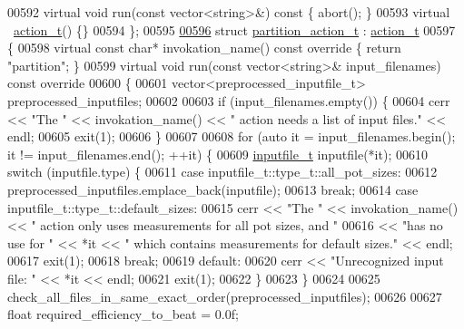 \begin{DoxyCode}
{{{{00592   \textcolor{keyword}{virtual} \textcolor{keywordtype}{void} run(\textcolor{keyword}{const} vector<string>&)\textcolor{keyword}{ const }\{ abort(); \}
00593   \textcolor{keyword}{virtual} ~\hyperlink{structaction__t}{action\_t}() \{\}
00594 \};
00595 
\hyperlink{structpartition__action__t}{00596} \textcolor{keyword}{struct }\hyperlink{structpartition__action__t}{partition\_action\_t} : \hyperlink{structaction__t}{action\_t}
00597 \{
00598   \textcolor{keyword}{virtual} \textcolor{keyword}{const} \textcolor{keywordtype}{char}* invokation\_name()\textcolor{keyword}{ const override }\{ \textcolor{keywordflow}{return} \textcolor{stringliteral}{"partition"}; \}
00599   \textcolor{keyword}{virtual} \textcolor{keywordtype}{void} run(\textcolor{keyword}{const} vector<string>& input\_filenames)\textcolor{keyword}{ const override}
00600 \textcolor{keyword}{  }\{
00601     vector<preprocessed\_inputfile\_t> preprocessed\_inputfiles;
00602 
00603     \textcolor{keywordflow}{if} (input\_filenames.empty()) \{
00604       cerr << \textcolor{stringliteral}{"The "} << invokation\_name() << \textcolor{stringliteral}{" action needs a list of input files."} << endl;
00605       exit(1);
00606     \}
00607 
00608     \textcolor{keywordflow}{for} (\textcolor{keyword}{auto} it = input\_filenames.begin(); it != input\_filenames.end(); ++it) \{
00609       \hyperlink{structinputfile__t}{inputfile\_t} inputfile(*it);
00610       \textcolor{keywordflow}{switch} (inputfile.type) \{
00611         \textcolor{keywordflow}{case} inputfile\_t::type\_t::all\_pot\_sizes:
00612           preprocessed\_inputfiles.emplace\_back(inputfile);
00613           \textcolor{keywordflow}{break};
00614         \textcolor{keywordflow}{case} inputfile\_t::type\_t::default\_sizes:
00615           cerr << \textcolor{stringliteral}{"The "} << invokation\_name() << \textcolor{stringliteral}{" action only uses measurements for all pot sizes, and "}
00616                << \textcolor{stringliteral}{"has no use for "} << *it << \textcolor{stringliteral}{" which contains measurements for default sizes."} << endl;
00617           exit(1);
00618           \textcolor{keywordflow}{break};
00619         \textcolor{keywordflow}{default}:
00620           cerr << \textcolor{stringliteral}{"Unrecognized input file: "} << *it << endl;
00621           exit(1);
00622       \}
00623     \}
00624 
00625     check\_all\_files\_in\_same\_exact\_order(preprocessed\_inputfiles);
00626 
00627     \textcolor{keywordtype}{float} required\_efficiency\_to\_beat = 0.0f;
}}}}
\end{DoxyCode}
